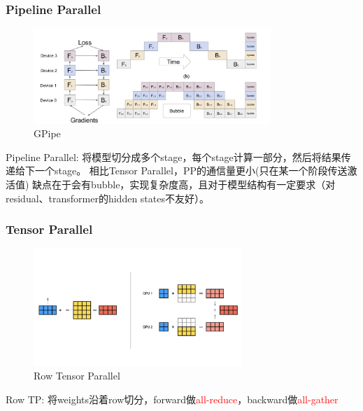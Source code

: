 \documentclass{beamer}
\begin{document}
\begin{frame}[fragile]
\frametitle{Pipeline Parallel}

\begin{figure}[h]
    \centering
    \includegraphics[width=0.8\textwidth]{gpipe.png}
    \captionsetup{labelformat=empty}
    \caption{GPipe}

\end{figure}

Pipeline Parallel: 将模型切分成多个stage，每个stage计算一部分，然后将结果传递给下一个stage。\newline
相比Tensor Parallel，PP的通信量更小(只在某一个阶段传送激活值)\newline
缺点在于会有bubble，实现复杂度高，且对于模型结构有一定要求（对residual、transformer的hidden states不友好）。

\end{frame}

\begin{frame}[fragile]
\frametitle{Tensor Parallel}

\begin{figure}[h]
    \centering
    \includegraphics[width=0.7\textwidth]{tp-rowwise.jpeg}
    \captionsetup{labelformat=empty}
    \caption{Row Tensor Parallel}
\end{figure}

Row TP: 将weights沿着row切分，forward做\textcolor{red}{all-reduce}，backward做\textcolor{red}{all-gather}\newline
\end{frame}
\end{document}
